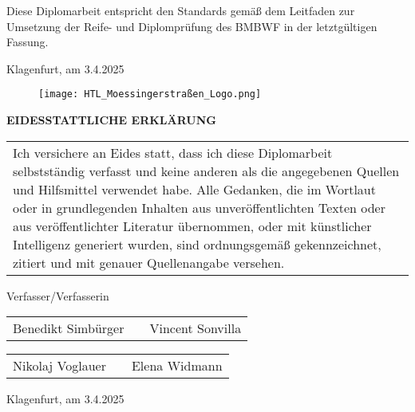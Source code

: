\documentclass[12pt, twoside]{article}
\begin{document}
\vspace{7mm}
\large
Diese Diplomarbeit entspricht den Standards gemäß dem Leitfaden zur Umsetzung der Reife- und Diplomprüfung des BMBWF in der letztgültigen Fassung.\par
\begin{flushright}
    Klagenfurt, am 3.4.2025
\end{flushright}

\newpage\null\thispagestyle{empty}\newpage

\begin{figure}[h]
    \texttt{[image: HTL\_Moessingerstraßen\_Logo.png]}
    \centering
\end{figure}

\begin{center}
    \huge \textbf{EIDESSTATTLICHE ERKLÄRUNG}\\
    \vspace{7mm}
    \large
    \begin{tabular}{p{14cm}}
        Ich versichere an Eides statt, dass ich diese Diplomarbeit
        selbstständig verfasst und keine anderen als die angegebenen
        Quellen und Hilfsmittel verwendet habe. Alle Gedanken, die im
        Wortlaut oder in grundlegenden Inhalten aus unveröffentlichten
        Texten oder aus veröffentlichter Literatur übernommen, oder mit
        künstlicher Intelligenz generiert wurden, sind ordnungsgemäß
        gekennzeichnet, zitiert und mit genauer Quellenangabe
        versehen.
    \end{tabular}

    \vspace{10mm}
    Verfasser/Verfasserin\\
    \vspace{45mm}
    \begin{tabular}{P{67mm}cP{67mm}}
        Benedikt Simbürger & & Vincent Sonvilla\\
    \end{tabular}
    
    \vspace{35mm}
    \begin{tabular}{P{67mm}cP{67mm}}
        Nikolaj Voglauer & & Elena Widmann\\
    \end{tabular}

    \vspace*{\fill}
    \raggedleft Klagenfurt, am 3.4.2025
\end{center}
\end{document}
